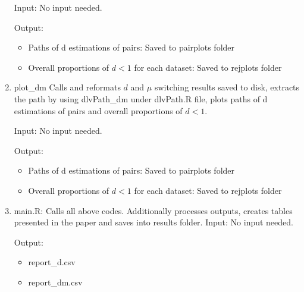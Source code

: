 \documentclass{article}
\begin{document}
\begin{enumerate}
	Input: No input needed.
	
	Output:
	\begin{itemize}
		\item Paths of d estimations of pairs: Saved to pairplots folder
		\item Overall proportions of $ d < 1 $ for each dataset: Saved to rejplots folder
	\end{itemize} 
	
	\item plot\_dm Calls and reformats $ d $ and $ \mu $ switching results saved to disk, extracts the path by using dlvPath\_dm under dlvPath.R file, plots paths of d estimations of pairs and overall proportions of $ d < 1 $.
		
	Input: No input needed.

	Output:
	\begin{itemize}
		\item Paths of d estimations of pairs: Saved to pairplots folder
		\item Overall proportions of $ d < 1 $ for each dataset: Saved to rejplots folder
	\end{itemize} 


	\item main.R: Calls all above codes. Additionally processes outputs, creates tables presented in the paper and saves into results folder.
	Input: No input needed.
	
	Output:
	\begin{itemize}
		\item report\_d.csv
		\item report\_dm.csv
	\end{itemize}
	
\end{enumerate}
\end{document}
